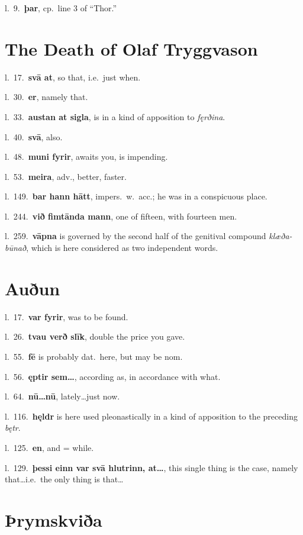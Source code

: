 \documentclass[12pt,letterpaper]{book}
\begin{document}
l.\ 9.\ \textbf{þar}, cp.\ line 3 of ``Thor.''


\section{The Death of Olaf Tryggvason}

l.\ 17.\ \textbf{svā at}, so that, i.e.\ just when.

l.\ 30.\ \textbf{er}, namely that.

l.\ 33.\ \textbf{austan at sigla}, is in a kind of apposition to
\textit{fęrðina}.

l.\ 40.\ \textbf{svā}, also.

l.\ 48.\ \textbf{muni fyrir}, awaits you, is impending.

l.\ 53.\ \textbf{meira}, adv., better, faster.

l.\ 149.\ \textbf{bar hann hātt}, impers.\ w.\ acc.; he was in a conspicuous
place.

l.\ 244.\ \textbf{við fimtānda mann}, one of fifteen, with fourteen men.

l.\ 259.\ \textbf{vāpna} is governed by the second half of the genitival
compound \textit{klæða-būnað}, which is here considered as two
independent words.


\section{Auðun}

l.\ 17.\ \textbf{var fyrir}, was to be found.

l.\ 26.\ \textbf{tvau verð slīk}, double the price you gave.

l.\ 55.\ \textbf{fē} is probably dat.\ here, but may be nom.

l.\ 56.\ \textbf{ęptir sem\ldots}, according as, in accordance with what.

l.\ 64.\ \textbf{nū\ldots nū}, lately\ldots just now.

l.\ 116.\ \textbf{hęldr} is here used pleonastically in a kind of
apposition to the preceding \textit{bętr}.

l.\ 125.\ \textbf{en}, and = while.

l.\ 129.\ \textbf{þessi einn var svā hlutrinn, at\ldots}, this single thing
is the case, namely that\ldots i.e.\ the only thing is that\ldots


\section{Þrymskviða}
\end{document}

